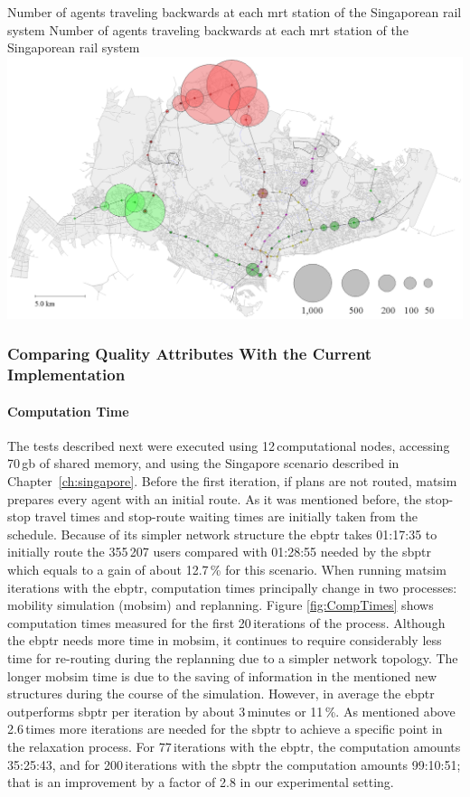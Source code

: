\createfigure
{Number of agents traveling backwards at each \protect\gls{mrt} station of the Singaporean rail system}
{Number of agents traveling backwards at each \protect\gls{mrt} station of the Singaporean rail system}
{\label{fig:Backwards}}
{\includegraphics[width=1.0\textwidth]{extending/figures/ebr/Backwards.png}}
{}

\subsubsection{Comparing Quality Attributes With the Current Implementation}

\paragraph{Computation Time}

The tests described next were executed using 12\,computational nodes, accessing 70\,\gls{gb} of shared memory, and using the Singapore scenario described in Chapter~\ref{ch:singapore}. Before the first iteration, if plans are not routed, \gls{matsim} prepares every agent with an initial route. As it was mentioned before, the stop-stop travel times and stop-route waiting times are initially taken from the schedule. Because of its simpler network structure the \gls{ebptr} takes 01:17:35 to initially route the 355\,207 users compared with 01:28:55 needed by the \gls{sbptr} which equals to a gain of about 12.7\,\% for this scenario. When running \gls{matsim} iterations with the \gls{ebptr}, computation times principally change in two processes: mobility simulation (mobsim) and replanning. Figure \ref{fig:CompTimes} shows computation times measured for the first 20\,iterations of the process. Although the \gls{ebptr} needs more time in \gls{mobsim}, it continues to require considerably less time for re-routing during the replanning due to a simpler network topology. The longer mobsim time is due to the saving of information in the mentioned new structures during the course of the simulation. However, in average the \gls{ebptr} outperforms \gls{sbptr} per iteration by about 3\,minutes or 11\,\%. As mentioned above 2.6\,times more iterations are needed for the \gls{sbptr} to achieve a specific point in the relaxation process. For 77\,iterations with the \gls{ebptr}, the computation amounts 35:25:43, and for 200\,iterations with the \gls{sbptr} the computation amounts 99:10:51; that is an improvement by a factor of 2.8 in our experimental setting.

